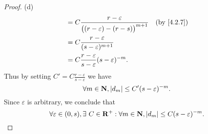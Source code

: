 \begin{proof}{(d)}
\begin{align*}
                                & = C \frac{r - \varepsilon}{\big((r - \varepsilon) - (r - s)\big)^{m + 1}}                      & \text{(by \cref{4.2.7})}    \\
                                & = C \frac{r - \varepsilon}{(s - \varepsilon)^{m + 1}}                                                                        \\
                                & = C \frac{r - \varepsilon}{s - \varepsilon} (s - \varepsilon)^{-m}.
  \end{align*}
  Thus by setting \(C' = C \frac{r - \varepsilon}{s - \varepsilon}\) we have
  \[
    \forall m \in \mathbf{N}, \left\lvert d_m\right\rvert \leq C' (s - \varepsilon)^{-m}.
  \]
  Since \(\varepsilon\) is arbitrary, we conclude that
  \[
    \forall \varepsilon \in (0, s), \exists\ C \in \mathbf{R}^+ : \forall m \in \mathbf{N}, \left\lvert d_m\right\rvert \leq C (s - \varepsilon)^{-m}.
  \]
\end{proof}

